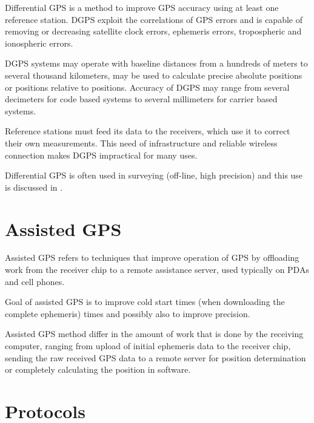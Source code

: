 Differential GPS is a method to improve GPS accuracy using at least one reference station.
DGPS exploit the correlations of GPS errors and is capable of removing or decreasing satellite clock errors,
ephemeris errors, tropospheric and ionospheric errors.

DGPS systems may operate with baseline distances from a hundreds of meters to several thousand kilometers,
may be used to calculate precise absolute positions or positions relative to positions.
Accuracy of DGPS may range from several decimeters for code based systems to several
millimeters for carrier based systems.

Reference stations must feed its data to the receivers, which use it to correct their own measurements.
This need of infrastructure and reliable wireless connection makes DGPS impractical for many uses.


Differential GPS is often used in surveying (off-line, high precision) and this
use is discussed in \cite{rizos99}.

\section{Assisted GPS}
Assisted GPS refers to techniques that improve operation of GPS by offloading
work from the receiver chip to a remote assistance server, used typically on PDAs and cell phones.

Goal of assisted GPS is to improve cold start times (when downloading the complete
ephemeris) times and possibly also to improve precision.

Assisted GPS method differ in the amount of work that is done by the receiving computer,
ranging from upload of initial ephemeris data to the receiver chip,
sending the raw received GPS data to a remote server for position determination or
completely calculating the position in software.



\section{Protocols}
